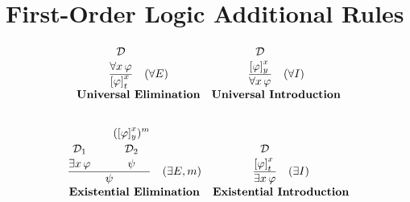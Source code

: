 \section{First-Order Logic Additional Rules}

\[
\begin{array}{c c}
\frac{{\overset{\displaystyle\mathcal{D} \strut} {\displaystyle\forall x \, \varphi 
\strut}}}{\displaystyle\left[ \varphi \right]^x_{\substack{t}}\strut} \quad (\forall E)
& \frac{{\overset{\displaystyle\mathcal{D} \strut} {\displaystyle\left[ \varphi\right]^x_{\substack{y}} 
\strut}}}{\displaystyle\forall x \, \varphi\strut} \quad (\forall I) \\[5pt]
\textbf{Universal Elimination} & \textbf{Universal Introduction}\\[10pt]
\end{array}
\]

\[
\begin{array}{c c}
\frac{\overset{\displaystyle\mathcal{D}_1 \strut} {\displaystyle\exists x \, \varphi \strut} \quad \quad \overset{\displaystyle(\left[ \varphi \right]^x_{\substack{y}})^m\strut}{\overset{\displaystyle\mathcal{D}_2 \strut} {\displaystyle\psi 
\strut}}}{\displaystyle\psi\strut} \quad (\exists E, m)
& \frac{{\overset{\displaystyle\mathcal{D} \strut} {\displaystyle\left[ \varphi \right]^x_{\substack{t}} 
\strut}}}{\displaystyle\exists x \, \varphi\strut} \quad (\exists I) \\[5pt]
\textbf{Existential Elimination} & \textbf{Existential Introduction}\\[10pt]
\end{array}
\]